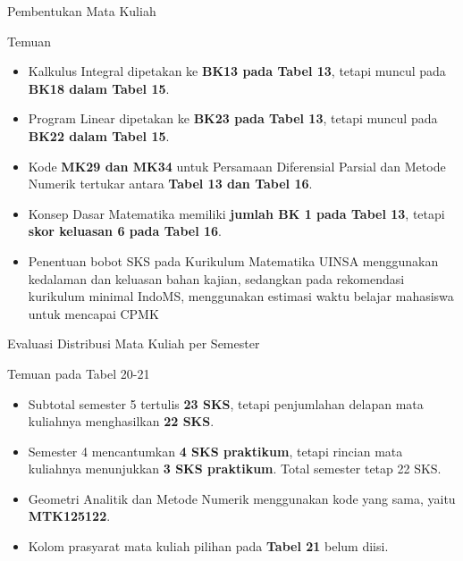 \documentclass[aspectratio=169,11pt]{beamer}
\begin{document}
\begin{frame}{Pembentukan Mata Kuliah}

\begin{block}{Temuan}
\begin{itemize}
\item Kalkulus Integral dipetakan ke \textbf{BK13 pada Tabel 13},
tetapi muncul pada \textbf{BK18 dalam Tabel 15}.
\item Program Linear dipetakan ke \textbf{BK23 pada Tabel 13},
tetapi muncul pada \textbf{BK22 dalam Tabel 15}.
\item Kode \textbf{MK29 dan MK34} untuk Persamaan Diferensial
Parsial dan Metode Numerik tertukar antara
\textbf{Tabel 13 dan Tabel 16}.
\item Konsep Dasar Matematika memiliki \textbf{jumlah BK 1
pada Tabel 13}, tetapi \textbf{skor keluasan 6
pada Tabel 16}.
\end{itemize}
\end{block}

\begin{itemize}
\item Penentuan bobot SKS pada Kurikulum Matematika UINSA menggunakan kedalaman dan keluasan bahan kajian, sedangkan pada rekomendasi kurikulum minimal IndoMS, menggunakan estimasi waktu belajar mahasiswa untuk mencapai CPMK
\end{itemize}

\end{frame}

\begin{frame}{Evaluasi Distribusi Mata Kuliah per Semester}

\begin{block}{Temuan pada Tabel 20-21}
\begin{itemize}
\item Subtotal semester 5 tertulis \textbf{23 SKS}, tetapi
penjumlahan delapan mata kuliahnya menghasilkan
\textbf{22 SKS}.
\item Semester 4 mencantumkan \textbf{4 SKS praktikum},
tetapi rincian mata kuliahnya menunjukkan
\textbf{3 SKS praktikum}. Total semester tetap 22 SKS.
\item Geometri Analitik dan Metode Numerik menggunakan
kode yang sama, yaitu \textbf{MTK125122}.
\item Kolom prasyarat mata kuliah pilihan pada
\textbf{Tabel 21} belum diisi.
\end{itemize}
\end{block}

\end{frame}
\end{document}
